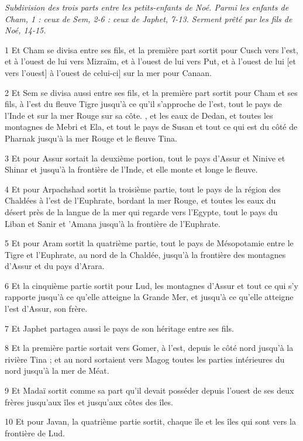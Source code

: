 
\par \textit{Subdivision des trois parts entre les petits-enfants de Noé. Parmi les enfants de Cham, 1 : ceux de Sem, 2-6 : ceux de Japhet, 7-13. Serment prêté par les fils de Noé, 14-15.}

\par 1 Et Cham se divisa entre ses fils, et la première part sortit pour Cusch vers l'est, et à l'ouest de lui vers Mizraïm, et à l'ouest de lui vers Put, et à l'ouest de lui [et vers l'ouest] à l'ouest de celui-ci] sur la mer pour Canaan.
\par 2 Et Sem se divisa aussi entre ses fils, et la première part sortit pour Cham et ses fils, à l'est du fleuve Tigre jusqu'à ce qu'il s'approche de l'est, tout le pays de l'Inde et sur la mer Rouge sur sa côte. , et les eaux de Dedan, et toutes les montagnes de Mebri et Ela, et tout le pays de Susan et tout ce qui est du côté de Pharnak jusqu'à la mer Rouge et le fleuve Tina.
\par 3 Et pour Assur sortait la deuxième portion, tout le pays d'Assur et Ninive et Shinar et jusqu'à la frontière de l'Inde, et elle monte et longe le fleuve.
\par 4 Et pour Arpachshad sortit la troisième partie, tout le pays de la région des Chaldées à l'est de l'Euphrate, bordant la mer Rouge, et toutes les eaux du désert près de la langue de la mer qui regarde vers l'Egypte, tout le pays du Liban et Sanir et 'Amana jusqu'à la frontière de l'Euphrate.
\par 5 Et pour Aram sortit la quatrième partie, tout le pays de Mésopotamie entre le Tigre et l'Euphrate, au nord de la Chaldée, jusqu'à la frontière des montagnes d'Assur et du pays d'Arara.
\par 6 Et la cinquième partie sortit pour Lud, les montagnes d'Assur et tout ce qui s'y rapporte jusqu'à ce qu'elle atteigne la Grande Mer, et jusqu'à ce qu'elle atteigne l'est d'Assur, son frère.
\par 7 Et Japhet partagea aussi le pays de son héritage entre ses fils.
\par 8 Et la première partie sortait vers Gomer, à l'est, depuis le côté nord jusqu'à la rivière Tina ; et au nord sortaient vers Magog toutes les parties intérieures du nord jusqu'à la mer de Méat.
\par 9 Et Madaï sortit comme sa part qu'il devait posséder depuis l'ouest de ses deux frères jusqu'aux îles et jusqu'aux côtes des îles.
\par 10 Et pour Javan, la quatrième partie sortit, chaque île et les îles qui sont vers la frontière de Lud.
